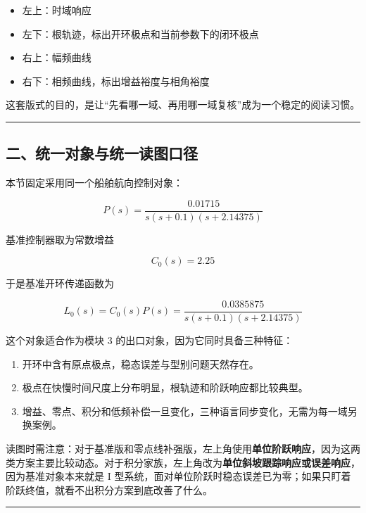 \documentclass[
  11pt]{article}
\providecommand{\tightlist}{%
  \setlength{\itemsep}{0pt}\setlength{\parskip}{0pt}}
\begin{document}
\begin{itemize}
\tightlist
\item
  左上：时域响应
\item
  左下：根轨迹，标出开环极点和当前参数下的闭环极点
\item
  右上：幅频曲线
\item
  右下：相频曲线，标出增益裕度与相角裕度
\end{itemize}

这套版式的目的，是让``先看哪一域、再用哪一域复核''成为一个稳定的阅读习惯。

\begin{center}\rule{0.5\linewidth}{0.5pt}\end{center}

\subsection{二、统一对象与统一读图口径}\label{ux4e8cux7edfux4e00ux5bf9ux8c61ux4e0eux7edfux4e00ux8bfbux56feux53e3ux5f84}

本节固定采用同一个船舶航向控制对象：

\[
P(s)=\frac{0.01715}{s(s+0.1)(s+2.14375)}
\]

基准控制器取为常数增益

\[
C_0(s)=2.25
\]

于是基准开环传递函数为

\[
L_0(s)=C_0(s)P(s)=\frac{0.0385875}{s(s+0.1)(s+2.14375)}
\]

这个对象适合作为模块 3 的出口对象，因为它同时具备三种特征：

\begin{enumerate}
\def\labelenumi{\arabic{enumi}.}
\tightlist
\item
  开环中含有原点极点，稳态误差与型别问题天然存在。
\item
  极点在快慢时间尺度上分布明显，根轨迹和阶跃响应都比较典型。
\item
  增益、零点、积分和低频补偿一旦变化，三种语言同步变化，无需为每一域另换案例。
\end{enumerate}

读图时需注意：对于基准版和零点线补强版，左上角使用\textbf{单位阶跃响应}，因为这两类方案主要比较动态。对于积分家族，左上角改为\textbf{单位斜坡跟踪响应或误差响应}，因为基准对象本来就是
I
型系统，面对单位阶跃时稳态误差已为零；如果只盯着阶跃终值，就看不出积分方案到底改善了什么。

\begin{center}\rule{0.5\linewidth}{0.5pt}\end{center}
\end{document}
